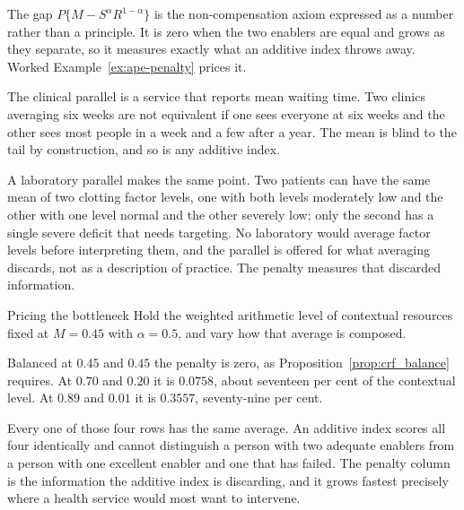 \begin{reading}
The gap $P\{M-S^{\alpha}R^{1-\alpha}\}$ is the non-compensation axiom expressed
as a number rather than a principle. It is zero when the two enablers are
equal and grows as they separate, so it measures exactly what an additive index
throws away. Worked Example~\ref{ex:ape-penalty} prices it.

The clinical parallel is a service that reports mean waiting time. Two clinics
averaging six weeks are not equivalent if one sees everyone at six weeks and the
other sees most people in a week and a few after a year. The mean is blind to
the tail by construction, and so is any additive index.

A laboratory parallel makes the same point. Two patients can have the same
mean of two clotting factor levels, one with both levels moderately low and the
other with one level normal and the other severely low; only the second has a
single severe deficit that needs targeting. No laboratory would average factor
levels before interpreting them, and the parallel is offered for what averaging
discards, not as a description of practice. The penalty measures that
discarded information.
\end{reading}

\begin{workedexample}{Pricing the bottleneck}
Hold the weighted arithmetic level of contextual resources fixed at $M=0.45$
with $\alpha=0.5$, and vary how that average is composed.


\noindent Balanced at $0.45$ and $0.45$ the penalty is zero, as
Proposition~\ref{prop:crf_balance} requires. At $0.70$ and $0.20$ it is
$0.0758$, about seventeen per cent of the contextual level. At $0.89$ and
$0.01$ it is $0.3557$, seventy-nine per cent.

Every one of those four rows has the same average. An additive index scores all
four identically and cannot distinguish a person with two adequate enablers
from a person with one excellent enabler and one that has failed. The penalty
column is the information the additive index is discarding, and it grows fastest
precisely where a health service would most want to intervene.

\end{workedexample}

